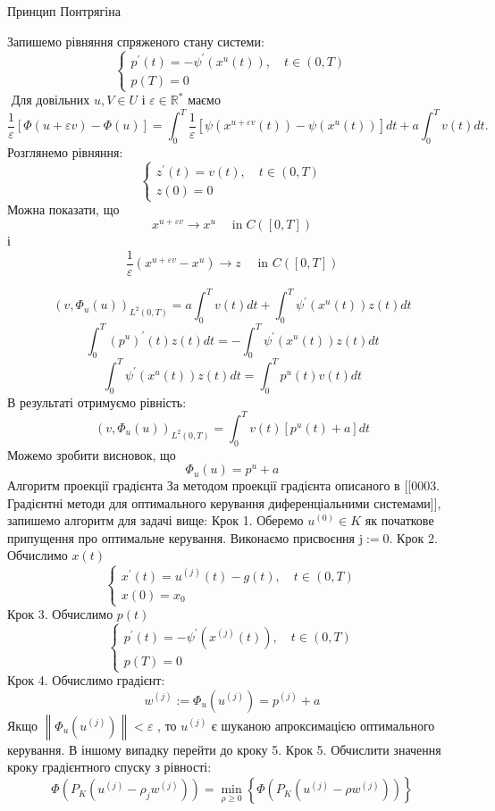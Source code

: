 \documentclass[a4paper,12pt]{extreport}
\begin{document}
Принцип Понтрягіна 


Запишемо рівняння спряженого стану системи:
$$
\left\{\begin{array}{l}
p^{\prime}(t)=-\psi^{\prime}\left(x^u(t)\right), \quad t \in(0, T) \\
p(T)=0
\end{array}\right.
$$
$\text { Для довільних } u, V \in U \text { і } \varepsilon \in \mathbb{R}^* \text { маємо }$
$$
\frac{1}{\varepsilon}[\Phi(u+\varepsilon v)-\Phi(u)]=\int_0^T \frac{1}{\varepsilon}\left[\psi\left(x^{u+\varepsilon v}(t)\right)-\psi\left(x^u(t)\right)\right] d t+a \int_0^T v(t) d t .
$$
Розглянемо рівняння:
$$
\left\{\begin{array}{l}
z^{\prime}(t)=v(t), \quad t \in(0, T) \\
z(0)=0
\end{array}\right.
$$
Можна показати, що
$$
x^{u+\varepsilon v} \longrightarrow x^u \quad \operatorname{in} C([0, T])
$$
і 
$$
\frac{1}{\varepsilon}\left(x^{u+\varepsilon v}-x^u\right) \longrightarrow z \quad \text { in } C([0, T])
$$

$$
\left(v, \Phi_u(u)\right)_{L^2(0, T)}=a \int_0^T v(t) d t+\int_0^T \psi^{\prime}\left(x^u(t)\right) z(t) d t
$$
$$
\int_0^T\left(p^u\right)^{\prime}(t) z(t) d t=-\int_0^T \psi^{\prime}\left(x^u(t)\right) z(t) d t
$$
$$
\int_0^T \psi^{\prime}\left(x^u(t)\right) z(t) d t=\int_0^T p^u(t) v(t) d t
$$
В результаті отримуємо рівність:
$$
\left(v, \Phi_u(u)\right)_{L^2(0, T)}=\int_0^T v(t)\left[p^u(t)+a\right] d t
$$
Можемо зробити висновок, що 
$$
\Phi_u(u)=p^u+a
$$
Алгоритм проекції градієнта
За методом проекції градієнта описаного в [[0003. Градієнтні методи для оптимального керування диференціальними системами]], запишемо алгоритм для задачі вище:
Крок 1. Оберемо $u^{(0)} \in K$ як початкове припущення про оптимальне керування. Виконаємо присвоєння $\mathrm{j}:=0$.
Крок 2. Обчислимо $x(t)$
$$
\left\{\begin{array}{l}
x^{\prime}(t)=u^{(j)}(t)-g(t), \quad t \in(0, T) \\
x(0)=x_0
\end{array}\right.
$$
Крок 3. Обчислимо $p(t)$
$$
\left\{\begin{array}{l}
p^{\prime}(t)=-\psi^{\prime}\left(x^{(j)}(t)\right), \quad t \in(0, T) \\
p(T)=0
\end{array}\right.
$$
Крок 4. Обчислимо градієнт:
$$
w^{(j)}:=\Phi_u\left(u^{(j)}\right)=p^{(j)}+a
$$
Якщо $\left\|\Phi_u\left(u^{(j)}\right)\right\|<\varepsilon$ , то $u^{(j)}$ є шуканою апроксимацією оптимального керування. 
В іншому випадку перейти до кроку 5.
Крок 5. Обчислити значення кроку градієнтного спуску з рівності:
$$
\Phi\left(P_K\left(u^{(j)}-\rho_j w^{(j)}\right)\right)=\min _{\rho \geq 0}\left\{\Phi\left(P_K\left(u^{(j)}-\rho w^{(j)}\right)\right)\right\}
$$
\end{document}
